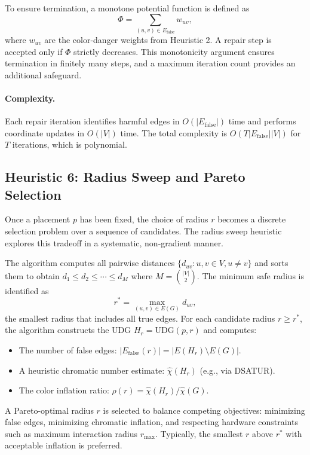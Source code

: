 \documentclass[11pt]{article}
\newcommand{\UDG}{\mathrm{UDG}}
\newcommand{\Efalse}{E_{\mathrm{false}}}
\newcommand{\chihat}{\widehat{\chi}}
\begin{document}
To ensure termination, a monotone potential function is defined as
\[
\Phi = \sum_{(u,v)\in\Efalse} w_{uv},
\]
where $w_{uv}$ are the color-danger weights from Heuristic 2. A repair step is accepted only if $\Phi$ strictly decreases. This monotonicity argument ensures termination in finitely many steps, and a maximum iteration count provides an additional safeguard.

\paragraph{Complexity.}
Each repair iteration identifies harmful edges in $O(|\Efalse|)$ time and performs coordinate updates in $O(|V|)$ time. The total complexity is $O(T|\Efalse||V|)$ for $T$ iterations, which is polynomial.

\newpage

\subsection{Heuristic 6: Radius Sweep and Pareto Selection}

Once a placement $p$ has been fixed, the choice of radius $r$ becomes a discrete selection problem over a sequence of candidates. The radius sweep heuristic explores this tradeoff in a systematic, non-gradient manner.

The algorithm computes all pairwise distances $\{d_{uv} : u,v\in V, u\neq v\}$ and sorts them to obtain $d_1 \le d_2 \le \cdots \le d_M$ where $M = \binom{|V|}{2}$. The minimum safe radius is identified as
\[
r^* = \max_{(u,v)\in E(G)} d_{uv},
\]
the smallest radius that includes all true edges. For each candidate radius $r \ge r^*$, the algorithm constructs the UDG $H_r=\UDG(p,r)$ and computes:
\begin{itemize}
  \item The number of false edges: $|\Efalse(r)| = |E(H_r) \setminus E(G)|$.
  \item A heuristic chromatic number estimate: $\chihat(H_r)$ (e.g., via DSATUR).
  \item The color inflation ratio: $\rho(r) = \chihat(H_r) / \chihat(G)$.
\end{itemize}

A Pareto-optimal radius $r$ is selected to balance competing objectives: minimizing false edges, minimizing chromatic inflation, and respecting hardware constraints such as maximum interaction radius $r_{\max}$. Typically, the smallest $r$ above $r^*$ with acceptable inflation is preferred.
\end{document}

